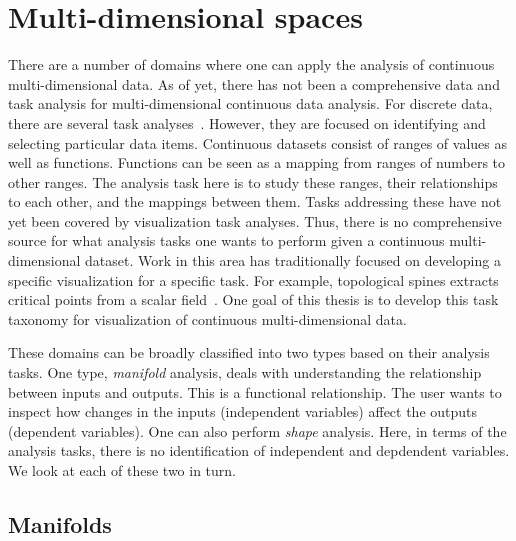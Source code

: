 
\section{Multi-dimensional spaces}
\label{sec:motivation:multi-d}

There are a number of domains where one can apply the analysis of continuous
multi-dimensional data.  As of yet, there has not been a comprehensive data and
task analysis for multi-dimensional continuous data analysis. For discrete
data, there are several task 
analyses~\cite{Shneiderman:1996,Brehmer:2013,Amar:2004}. 
However, they are
focused on identifying and selecting particular data items. Continuous datasets
consist of ranges of values as well as functions. Functions can be seen as a
mapping from ranges of numbers to other ranges. The analysis task here is to
study these ranges, their relationships to each other, and the mappings between
them. Tasks addressing these
have not yet been covered by visualization task analyses. Thus,
there is no comprehensive source for what analysis tasks one wants to perform
given a continuous multi-dimensional dataset.  Work in this area has
traditionally focused on developing a specific visualization for a specific
task. For example, topological spines extracts critical points from a scalar
field~\cite{Correa:2011}. One goal of this thesis is to develop this task
taxonomy for visualization of continuous multi-dimensional data.



These domains can be broadly classified into two types based on their analysis
tasks. One type, \emph{manifold} analysis, deals with understanding the
relationship between inputs and outputs. This is a functional relationship.
The user wants to inspect how changes in the inputs (independent variables)
affect the outputs (dependent variables). One can also perform \emph{shape}
analysis. Here, in terms of the analysis tasks, there is no identification of
independent and depdendent variables. We look at each of these two in turn.

\subsection{Manifolds}
\label{sec:manifolds}

